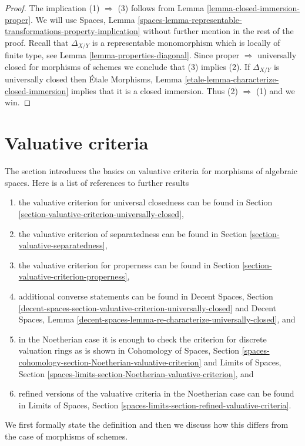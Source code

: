 \documentclass{stacks-project}
\theoremstyle{plain}
\theoremstyle{definition}
\theoremstyle{remark}
\numberwithin{equation}{subsection}
\begin{document}
\begin{proof}
The implication (1) $\Rightarrow$ (3) follows from
Lemma \ref{lemma-closed-immersion-proper}.
We will use
Spaces, Lemma
\ref{spaces-lemma-representable-transformations-property-implication}
without further mention in the rest of the proof.
Recall that $\Delta_{X/Y}$ is a representable
monomorphism which is locally of finite type, see
Lemma \ref{lemma-properties-diagonal}.
Since proper $\Rightarrow$ universally closed for morphisms of schemes
we conclude that (3) implies (2).
If $\Delta_{X/Y}$ is universally closed then
\'Etale Morphisms,
Lemma \ref{etale-lemma-characterize-closed-immersion}
implies that it is a closed immersion. Thus (2) $\Rightarrow$ (1)
and we win.
\end{proof}





\section{Valuative criteria}
\label{section-valuative}

\noindent
The section introduces the basics on valuative criteria for morphisms
of algebraic spaces. Here is a list of references to further results
\begin{enumerate}
\item the valuative criterion for universal closedness can be found in
Section \ref{section-valuative-criterion-universally-closed},
\item the valuative criterion of separatedness can be found in
Section \ref{section-valuative-separatedness},
\item the valuative criterion for properness can be found in
Section \ref{section-valuative-criterion-properness},
\item additional converse statements can be found in
Decent Spaces, Section
\ref{decent-spaces-section-valuative-criterion-universally-closed}
and Decent Spaces, Lemma
\ref{decent-spaces-lemma-re-characterize-universally-closed}, and
\item in the Noetherian case it is enough to check the criterion for
discrete valuation rings as is shown in Cohomology of Spaces, Section
\ref{spaces-cohomology-section-Noetherian-valuative-criterion} and
Limits of Spaces, Section
\ref{spaces-limits-section-Noetherian-valuative-criterion}, and
\item refined versions of the valuative criteria in the Noetherian
case can be found in Limits of Spaces, Section
\ref{spaces-limits-section-refined-valuative-criteria}.
\end{enumerate}
We first formally state the definition and then we discuss how this
differs from the case of morphisms of schemes.
\end{document}
